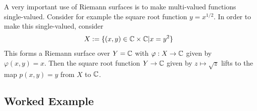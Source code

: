 \begin{example}
    A very important use of Riemann surfaces is to make multi-valued functions single-valued. Consider for example the square root function $y = x^{1/2}$. In order to make this single-valued, consider 
    $$X := \{(x, y) \in \mathbb{C} \times \mathbb{C} | x = y^2\}$$ 
    This forms a Riemann surface over $Y = \mathbb{C}$ with $\varphi: X \to \mathbb{C}$ given by $\varphi(x, y) = x$. Then the square root function $Y \to \mathbb{C}$ given by $z \mapsto \sqrt{z}$ lifts to the map $p(x, y) = y$ from $X$ to $\mathbb{C}$. 

\end{example}

\subsection{Worked Example}
